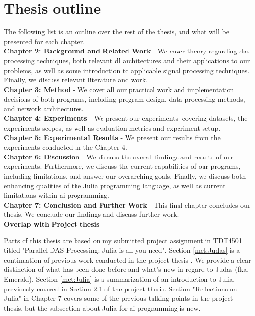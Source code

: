 \section{Thesis outline}

The following list is an outline over the rest of the thesis, and what will be presented for each chapter. \\


\textbf{Chapter 2: Background and Related Work} - We cover theory regarding \acrshort{das} processing techniques, both relevant \acrshort{dl} architectures and their applications to our problems, as well as some introduction to applicable signal processing techniques. Finally, we discuss relevant literature and work.  \\

\textbf{Chapter 3: Method} - We cover all our practical work and implementation decisions of both programs, including program design, data processing methods, and network architectures. \\

\textbf{Chapter 4: Experiments} - We present our experiments, covering datasets, the experiments scopes, as well as evaluation metrics and experiment setup. \\

\textbf{Chapter 5: Experimental Results} - We present our results from the experiments conducted in the Chapter 4. \\

\textbf{Chapter 6: Discussion} - We discuss the overall findings and results of our experiments. Furthermore, we discuss the current capabilities of our programs, including limitations, and answer our overarching goals. Finally, we discuss both enhancing qualities of the Julia programming language, as well as current limitations within \acrshort{ai} programming. \\

\textbf{Chapter 7: Conclusion and Further Work} - This final chapter concludes our thesis. We conclude our findings and discuss further work. \\

\textbf{Overlap with Project thesis}

Parts of this thesis are based on my submitted project assignment in TDT4501 titled "Parallel DAS Processing: Julia is all you need". Section \ref{met:Judas} is a continuation of previous work conducted in the project thesis \cite{projthesis}. We provide a clear distinction of what has been done before and what's new in regard to Judas (fka. Emerald). Section \ref{met:Julia} is a summarization of an introduction to Julia, previously covered in Section 2.1 of the project thesis. Section "Reflections on Julia" in Chapter 7 covers some of the previous talking points in the project thesis, but the subsection about Julia for \acrshort{ai} programming is new.